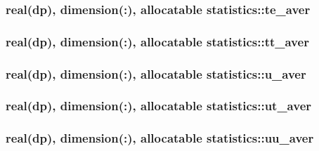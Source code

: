 \hypertarget{classstatistics_a3140050f5b63e50c892d060d942c2f03}{
\subsubsection[{te\-\_\-aver}]{\setlength{\rightskip}{0pt plus 5cm}real(dp), dimension(\-:), allocatable statistics\-::te\-\_\-aver}}\label{classstatistics_a3140050f5b63e50c892d060d942c2f03}
\hypertarget{classstatistics_adb9d6ed22dab363f8eff806214d98e3a}{
\subsubsection[{tt\-\_\-aver}]{\setlength{\rightskip}{0pt plus 5cm}real(dp), dimension(\-:), allocatable statistics\-::tt\-\_\-aver}}\label{classstatistics_adb9d6ed22dab363f8eff806214d98e3a}
\hypertarget{classstatistics_ad94122d3cacddedfe42923a3f3b92c69}{
\subsubsection[{u\-\_\-aver}]{\setlength{\rightskip}{0pt plus 5cm}real(dp), dimension(\-:), allocatable statistics\-::u\-\_\-aver}}\label{classstatistics_ad94122d3cacddedfe42923a3f3b92c69}
\hypertarget{classstatistics_aa2089819b01b5d358101abf20ac5789a}{
\subsubsection[{ut\-\_\-aver}]{\setlength{\rightskip}{0pt plus 5cm}real(dp), dimension(\-:), allocatable statistics\-::ut\-\_\-aver}}\label{classstatistics_aa2089819b01b5d358101abf20ac5789a}
\hypertarget{classstatistics_a79d376e13ed6870a2f592fba0fb90f07}{
\subsubsection[{uu\-\_\-aver}]{\setlength{\rightskip}{0pt plus 5cm}real(dp), dimension(\-:), allocatable statistics\-::uu\-\_\-aver}}\label{classstatistics_a79d376e13ed6870a2f592fba0fb90f07}
